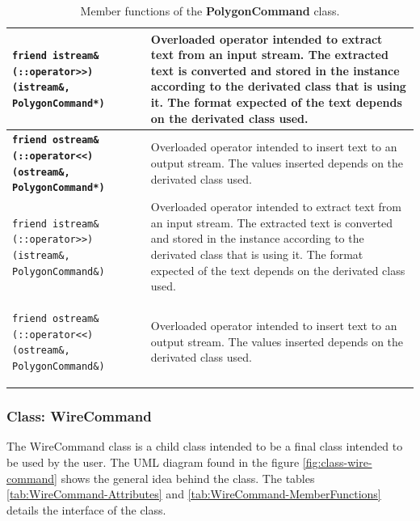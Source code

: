 \documentclass[11pt,twoside,openany,x11names,svgnames]{memoir}
\begin{document}
\begin{table}[h]
\begin{tabular}{| >{\bfseries}p{7.5cm} | p{8cm} |}
	\hline	
	
	\texttt{friend istream\& (::operator>>) (istream\&, PolygonCommand*)} & Overloaded operator intended to extract text from an input stream. The extracted text is converted and stored in the instance according to the derivated class that is using it. The format expected of the text depends on the derivated class used. \\
	
	\hline
	
	\texttt{friend ostream\& (::operator<<) (ostream\&, PolygonCommand*)} & Overloaded operator intended to insert text to an output stream. The values inserted depends on the derivated class used. \\
	
	\hline
	
	\texttt{friend istream\& (::operator>>) (istream\&, PolygonCommand\&)} & Overloaded operator intended to extract text from an input stream. The extracted text is converted and stored in the instance according to the derivated class that is using it. The format expected of the text depends on the derivated class used. \\
	
	\hline
	
	\texttt{friend ostream\& (::operator<<) (ostream\&, PolygonCommand\&)} & Overloaded operator intended to insert text to an output stream. The values inserted depends on the derivated class used. \\
	
	\hline
	
\end{tabular}
\caption{Member functions of the \textbf{PolygonCommand} class.}
\label{tab:PolygonCommand-MemberFunctions}
\end{table}

\clearpage

\subsubsection{Class: WireCommand}\label{Class-WireCommand}

The WireCommand class is a child class intended to be a final class intended to be used by the user. The UML diagram found in the figure \ref{fig:class-wire-command} shows the general idea behind the class. The tables \ref{tab:WireCommand-Attributes} and \ref{tab:WireCommand-MemberFunctions} details the interface of the class.
\end{document}
